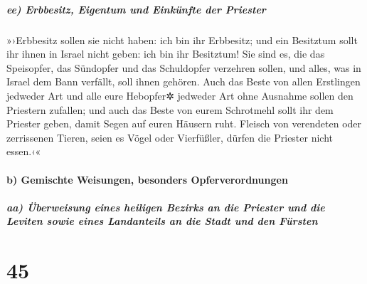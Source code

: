 \hypertarget{ee-erbbesitz-eigentum-und-einkuxfcnfte-der-priester}{%
\subparagraph{ee) Erbbesitz, Eigentum und Einkünfte der
Priester}\label{ee-erbbesitz-eigentum-und-einkuxfcnfte-der-priester}}

»›Erbbesitz sollen sie nicht haben: ich bin ihr
Erbbesitz; und ein Besitztum sollt ihr ihnen in Israel nicht geben: ich
bin ihr Besitztum! Sie sind es, die das Speisopfer, das
Sündopfer und das Schuldopfer verzehren sollen, und alles, was in Israel
dem Bann verfällt, soll ihnen gehören. Auch das Beste von
allen Erstlingen jedweder Art und alle eure Hebopfer✲ jedweder Art ohne
Ausnahme sollen den Priestern zufallen; und auch das Beste von eurem
Schrotmehl sollt ihr dem Priester geben, damit Segen auf euren Häusern
ruht. Fleisch von verendeten oder zerrissenen Tieren,
seien es Vögel oder Vierfüßler, dürfen die Priester nicht essen.‹«

\hypertarget{b-gemischte-weisungen-besonders-opferverordnungen}{%
\paragraph{b) Gemischte Weisungen, besonders
Opferverordnungen}\label{b-gemischte-weisungen-besonders-opferverordnungen}}

\hypertarget{aa-uxfcberweisung-eines-heiligen-bezirks-an-die-priester-und-die-leviten-sowie-eines-landanteils-an-die-stadt-und-den-fuxfcrsten}{%
\subparagraph{aa) Überweisung eines heiligen Bezirks an die Priester und
die Leviten sowie eines Landanteils an die Stadt und den
Fürsten}\label{aa-uxfcberweisung-eines-heiligen-bezirks-an-die-priester-und-die-leviten-sowie-eines-landanteils-an-die-stadt-und-den-fuxfcrsten}}

\hypertarget{section-44}{%
\section{45}\label{section-44}}

